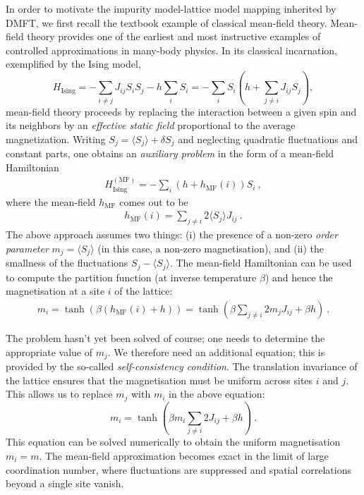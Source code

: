 In order to motivate the impurity model-lattice model mapping inherited by DMFT, we first recall the textbook example of classical mean-field theory. Mean-field theory provides one of the earliest and most instructive examples of controlled approximations in many-body physics. In its classical incarnation, exemplified by the Ising model,
\begin{equation}
	H_{\mathrm{Ising}} = - \sum_{i\neq j} J_{ij} S_i S_j - h \sum_i S_i = -\sum_i S_i(h + \sum_{j \neq i}J_{ij}S_j),
\end{equation}
mean-field theory proceeds by replacing the interaction between a given spin and its neighbors by an {\it effective static field} proportional to the average magnetization. Writing
\(
S_j = \langle S_j \rangle + \delta S_j
\)
and neglecting quadratic fluctuations and constant parts, one obtains an {\it auxiliary problem} in the form of a mean-field Hamiltonian
\begin{equation}\begin{aligned}
	H^{(\text{MF})}_{\mathrm{Ising}} = - \sum_{i} (h + h_\text{MF}(i))S_i~,
\end{aligned}\end{equation}
where the mean-field \(h_\text{MF}\) comes out to be
\begin{equation}\begin{aligned}\label{mean-field}
	h_\text{MF}(i) = \sum_{j \neq i}2 \langle S_j \rangle J_{ij}~.
\end{aligned}\end{equation}
The above approach assumes two things: (i) the presence of a non-zero {\it order parameter} \(m_j = \langle S_j \rangle \) (in this case, a non-zero magnetisation), and (ii) the smallness of the fluctuations \(S_j - \langle S_j \rangle\). The mean-field Hamiltonian can be used to compute the partition function (at inverse temperature \(\beta\)) and hence the magnetisation at a site \(i\) of the lattice:
\begin{equation}\begin{aligned}\label{magnetisation}
	m_i = \tanh(\beta(h_\text{MF}(i) + h)) = \tanh(\beta \sum_{j \neq i}2 m_j J_{ij} + \beta h)~.
\end{aligned}\end{equation}

The problem hasn't yet been solved of course; one needs to determine the appropriate value of \(m_j\). We therefore need an additional equation; this is provided by the so-called {\it self-consistency condition}. The translation invariance of the lattice ensures that the magnetisation must be uniform across sites \(i\) and \(j\). This allows us to replace \(m_j\) with \(m_i\) in the above equation:
\begin{equation}
	m_i = \tanh(\beta m_i\sum_{j \neq i}2 J_{ij} + \beta h)~.
\end{equation}
This equation can be solved numerically to obtain the uniform magnetisation \(m_i = m\).
The mean-field approximation becomes exact in the limit of large coordination number, where fluctuations are suppressed  and spatial correlations beyond a single site vanish.

